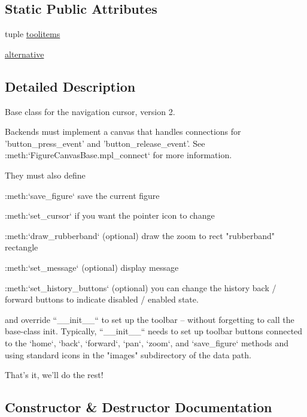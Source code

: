 \subsection*{Static Public Attributes}
\begin{DoxyCompactItemize}
\item 
tuple \hyperlink{classmatplotlib_1_1backend__bases_1_1NavigationToolbar2_ae47f74ab4379c8c1b8655b166a5a6f59}{toolitems}
\item 
\hyperlink{classmatplotlib_1_1backend__bases_1_1NavigationToolbar2_a6a61abc7dcf501eaafd89862b331bc10}{alternative}
\end{DoxyCompactItemize}


\subsection{Detailed Description}
\begin{DoxyVerb}Base class for the navigation cursor, version 2.

Backends must implement a canvas that handles connections for
'button_press_event' and 'button_release_event'.  See
:meth:`FigureCanvasBase.mpl_connect` for more information.

They must also define

  :meth:`save_figure`
     save the current figure

  :meth:`set_cursor`
     if you want the pointer icon to change

  :meth:`draw_rubberband` (optional)
     draw the zoom to rect "rubberband" rectangle

  :meth:`set_message` (optional)
     display message

  :meth:`set_history_buttons` (optional)
     you can change the history back / forward buttons to
     indicate disabled / enabled state.

and override ``__init__`` to set up the toolbar -- without forgetting to
call the base-class init.  Typically, ``__init__`` needs to set up toolbar
buttons connected to the `home`, `back`, `forward`, `pan`, `zoom`, and
`save_figure` methods and using standard icons in the "images" subdirectory
of the data path.

That's it, we'll do the rest!
\end{DoxyVerb}
 

\subsection{Constructor \& Destructor Documentation}
\mbox{\label{classmatplotlib_1_1backend__bases_1_1NavigationToolbar2_ae5aaa893e81958be2a9278406240c965}} 
